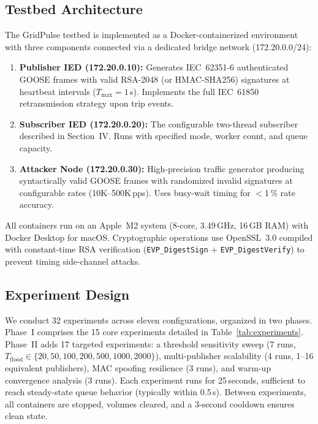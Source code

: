 \documentclass{ieeeaccess}
\begin{document}
\subsection{Testbed Architecture}
The GridPulse testbed is implemented as a Docker-containerized environment with three components connected via a dedicated bridge network (172.20.0.0/24):
\begin{enumerate}[leftmargin=*]
    \item \textbf{Publisher IED (172.20.0.10):} Generates IEC~62351-6 authenticated GOOSE frames with valid RSA-2048 (or HMAC-SHA256) signatures at heartbeat intervals ($T_{\max} = 1$\,s). Implements the full IEC~61850 retransmission strategy upon trip events.
    \item \textbf{Subscriber IED (172.20.0.20):} The configurable two-thread subscriber described in Section~IV. Runs with specified mode, worker count, and queue capacity.
    \item \textbf{Attacker Node (172.20.0.30):} High-precision traffic generator producing syntactically valid GOOSE frames with randomized invalid signatures at configurable rates (10K--500K\,pps). Uses busy-wait timing for $<$1\,\% rate accuracy.
\end{enumerate}

All containers run on an Apple~M2 system (8-core, 3.49\,GHz, 16\,GB RAM) with Docker Desktop for macOS. Cryptographic operations use OpenSSL~3.0 compiled with constant-time RSA verification (\texttt{EVP\_DigestSign} + \texttt{EVP\_DigestVerify}) to prevent timing side-channel attacks.

\subsection{Experiment Design}
We conduct 32 experiments across eleven configurations, organized in two phases. Phase~I comprises the 15 core experiments detailed in Table~\ref{tab:experiments}. Phase~II adds 17 targeted experiments: a threshold sensitivity sweep (7 runs, $T_{\text{flood}} \in \{20, 50, 100, 200, 500, 1000, 2000\}$), multi-publisher scalability (4 runs, 1--16 equivalent publishers), MAC spoofing resilience (3 runs), and warm-up convergence analysis (3 runs). Each experiment runs for 25\,seconds, sufficient to reach steady-state queue behavior (typically within 0.5\,s). Between experiments, all containers are stopped, volumes cleared, and a 3-second cooldown ensures clean state.
\end{document}

